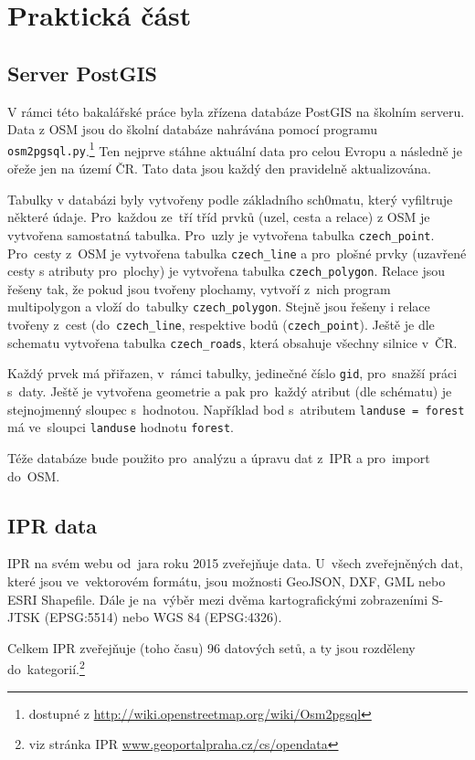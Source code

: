 \chapter{Praktická část}
\label{4-Praktická část}

\section{Server PostGIS}
\label{Server PostGIS} 
V rámci této bakalářské práce byla zřízena databáze PostGIS na školním
serveru. Data z OSM jsou do školní databáze nahrávána pomocí programu {\tt osm2pgsql.py}.\footnote{dostupné z \url{http://wiki.openstreetmap.org/wiki/Osm2pgsql}}
Ten nejprve stáhne aktuální data pro celou Evropu a následně je ořeže
jen na území ČR. Tato data jsou každý den pravidelně aktualizována.

Tabulky v databázi byly vytvořeny podle základního sch0matu, který
vyfiltruje některé údaje. Pro~každou ze~tří tříd prvků (uzel, cesta
a relace) z OSM je vytvořena samostatná tabulka. Pro~uzly je vytvořena
tabulka {\tt czech\_point}. Pro~cesty z~OSM je vytvořena tabulka
{\tt czech\_line} a pro~plošné prvky (uzavřené cesty s atributy
pro~plochy) je vytvořena tabulka {\tt czech\_polygon}. Relace jsou
řešeny tak, že pokud jsou tvořeny plochamy, vytvoří z~nich program
multipolygon a vloží do~tabulky {\tt czech\_polygon}. Stejně jsou
řešeny i relace tvořeny z~cest (do~{\tt czech\_line}, respektive bodů
({\tt czech\_point}). Ještě je dle schematu vytvořena tabulka
{\tt czech\_roads}, která obsahuje všechny silnice v~ČR.

Každý prvek má přiřazen, v~rámci tabulky, jedinečné číslo {\tt gid},
pro~snažší práci s~daty. Ještě je vytvořena geometrie a pak pro~každý
atribut (dle schématu) je stejnojmenný sloupec s~hodnotou. Například
bod s~atributem {\tt landuse = forest} má ve~sloupci {\tt landuse}
hodnotu {\tt forest}.

Téže databáze bude použito pro~analýzu a úpravu dat z~IPR a
pro~import do~OSM.

\section{IPR data}
\label{IPR data}
IPR na svém webu od~jara roku 2015 zveřejňuje data. U~všech
zveřejněných dat, které jsou ve~vektorovém formátu, jsou možnosti
GeoJSON, DXF, GML nebo ESRI Shapefile. Dále je na~výběr mezi dvěma
kartografickými zobrazeními S-JTSK (EPSG:5514) nebo WGS 84 (EPSG:4326).

Celkem IPR zveřejňuje (toho času) 96 datových setů, a ty jsou rozděleny
do~kategorií.\footnote{viz stránka IPR \url{www.geoportalpraha.cz/cs/opendata}}

